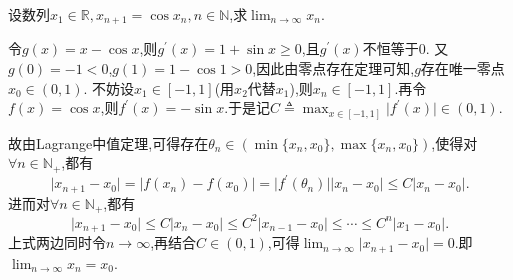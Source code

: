 \documentclass[lang=cn,newtx,10pt,scheme=chinese]{elegantbook}
\begin{document}
\begin{example}
设数列\(x_1\in\mathbb{R},x_{n + 1} = \cos x_n,n\in\mathbb{N}\),求\(\lim_{n \to \infty} x_n\).
\end{example}
\begin{solution}
令\(g(x)=x - \cos x\),则\(g^\prime(x)=1 + \sin x\geqslant0\),且\(g^\prime(x)\)不恒等于\(0\).
又\(g(0)= -1 < 0\),\(g(1)=1 - \cos 1 > 0\),因此由零点存在定理可知,\(g\)存在唯一零点\(x_0\in(0,1)\).
不妨设\(x_1\in[-1,1]\)(用\(x_2\)代替\(x_1\)),则\(x_n\in[-1,1]\).再令\(f(x)=\cos x\),则\(f^\prime(x)=-\sin x\).于是记\(C\triangleq \max_{x\in[-1,1]}\vert f^\prime(x)\vert\in(0,1)\).

故由Lagrange中值定理,可得存在\(\theta_n\in(\min\{x_n,x_0\},\max\{x_n,x_0\})\),使得对\(\forall n\in\mathbb{N}_+\),都有
\[
\vert x_{n + 1}-x_0\vert=\vert f(x_n)-f(x_0)\vert=\vert f^\prime(\theta_n)\vert\vert x_n - x_0\vert\leqslant C\vert x_n - x_0\vert.
\]
进而对\(\forall n\in\mathbb{N}_+\),都有
\[
\vert x_{n + 1}-x_0\vert\leqslant C\vert x_n - x_0\vert\leqslant C^2\vert x_{n - 1}-x_0\vert\leqslant\cdots\leqslant C^n\vert x_1 - x_0\vert.
\]
上式两边同时令\(n\rightarrow\infty\),再结合\(C\in(0,1)\),可得\(\lim_{n\rightarrow\infty}\vert x_{n + 1}-x_0\vert = 0\).即\(\lim_{n\rightarrow\infty}x_n = x_0\).
\end{solution}
\end{document}
